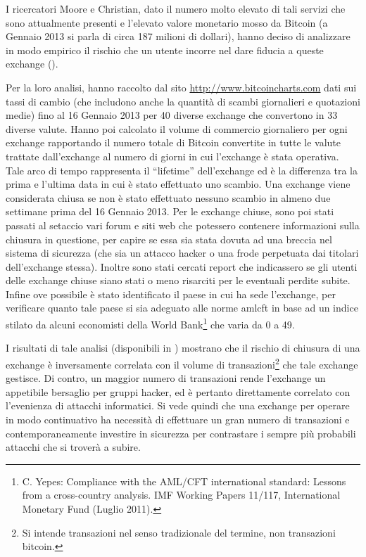I ricercatori Moore e Christian, dato il numero molto elevato di tali servizi che sono attualmente presenti e l'elevato valore monetario mosso da Bitcoin (a Gennaio 2013 si parla di circa 187 milioni di dollari), hanno deciso di analizzare in modo empirico il rischio che un utente incorre nel dare fiducia a queste exchange (\cite{middleman}).

Per la loro analisi, hanno raccolto dal sito \url{http://www.bitcoincharts.com} dati sui tassi di cambio (che includono anche la quantità di scambi giornalieri e quotazioni medie) fino al 16 Gennaio 2013 per 40 diverse exchange che convertono in 33 diverse valute.
Hanno poi calcolato il volume di commercio giornaliero per ogni exchange rapportando il numero totale di Bitcoin convertite in tutte le valute trattate dall'exchange al numero di giorni in cui l'exchange è stata operativa. Tale arco di tempo rappresenta il ``lifetime'' dell'exchange ed è la differenza tra la prima e l'ultima data in cui è stato effettuato uno scambio. Una exchange viene considerata chiusa se non è stato effettuato nessuno scambio in almeno due settimane prima del 16 Gennaio 2013.
Per le exchange chiuse, sono poi stati passati al setaccio vari forum e siti web che potessero contenere informazioni sulla chiusura in questione, per capire se essa sia stata dovuta ad una breccia nel sistema di sicurezza (che sia un attacco hacker o una frode perpetuata dai titolari dell'exchange stessa). Inoltre sono stati cercati report che indicassero se gli utenti delle exchange chiuse siano stati o meno risarciti per le eventuali perdite subite.
Infine ove possibile è stato identificato il paese in cui ha sede l'exchange, per verificare quanto tale paese si sia adeguato alle norme \gls{amlcft} in base ad un indice stilato da alcuni economisti della World Bank\footnote{C. Yepes: Compliance with the AML/CFT international standard: Lessons from a cross-country analysis. IMF Working Papers 11/117, International Monetary Fund (Luglio 2011).} che varia da 0 a 49.

I risultati di tale analisi (disponibili in \cite{middleman}) mostrano che il rischio di chiusura di una exchange è inversamente correlata con il volume di transazioni\footnote{Si intende transazioni nel senso tradizionale del termine, non transazioni bitcoin.} che tale exchange gestisce. Di contro, un maggior numero di transazioni rende l'exchange un appetibile bersaglio per gruppi hacker, ed è pertanto direttamente correlato con l'evenienza di attacchi informatici.
Si vede quindi che una exchange per operare in modo continuativo ha necessità di effettuare un gran numero di transazioni e contemporaneamente investire in sicurezza per contrastare i sempre più probabili attacchi che si troverà a subire.
